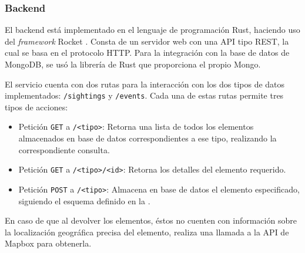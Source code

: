 \subsubsection{Backend}
El backend está implementado en el lenguaje de programación Rust, haciendo uso
del \textit{framework} Rocket \cite{rocket}. Consta de un servidor web con una 
API tipo REST, la cual se basa en el protocolo HTTP. Para la integración con
la base de datos de MongoDB, se usó la librería de Rust que proporciona el
propio Mongo.

El servicio cuenta con dos rutas para la interacción con los dos tipos de datos
implementados: \texttt{/sightings} y \texttt{/events}. Cada una de estas rutas
permite tres tipos de acciones:
\begin{itemize}
  \item Petición \texttt{GET} a \texttt{/<tipo>}: Retorna una lista de todos los
  elementos almacenados en base de datos correspondientes a ese tipo, realizando
  la correspondiente consulta.
  \item Petición \texttt{GET} a \texttt{/<tipo>/<id>}: Retorna los detalles del
  elemento requerido.
  \item Petición \texttt{POST} a \texttt{/<tipo>}: Almacena en base de datos el
  elemento especificado, siguiendo el esquema definido en la
  .
\end{itemize}

En caso de que al devolver los elementos, éstos no cuenten con información
sobre la localización geográfica precisa del elemento, realiza una llamada a la
API de Mapbox \cite{mapbox-api} para obtenerla.

